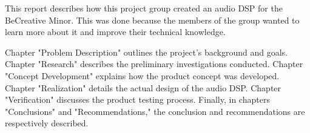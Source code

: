 This report describes how this project group created an audio DSP for the BeCreative Minor. This was done because the members of the group wanted to learn more about it and improve their technical knowledge.

Chapter "Problem Description" outlines the project's background and goals. Chapter "Research" describes the preliminary investigations conducted. Chapter "Concept Development" explains how the product concept was developed. Chapter "Realization" details the actual design of the audio DSP. Chapter "Verification" discusses the product testing process. Finally, in chapters "Conclusions" and "Recommendations," the conclusion and recommendations are respectively described.